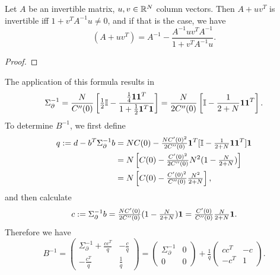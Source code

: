 \begin{lemma}
	Let \(A\) be an invertible matrix, \(u,v\in\mathbb{R}^N\) column vectors.
	Then \(A+ uv^T\) is invertible iff \(1+v^T A^{-1}u \neq 0\), and if that is
	the case, we have
	\[
		(A+uv^T) = A^{-1} - \frac{A^{-1}u v^T A^{-1}}{1+v^T A^{-1}u}.
	\]
\end{lemma}
\begin{proof}
\end{proof}

The application of this formula results in
\begin{equation}\label{eq: sigma_partial inverse}
	\Sigma_\partial^{-1}
	= \frac{N}{C''(0)}\left[
		\tfrac12\mathbb{I} - \frac{\tfrac14\mathbf{1}\mathbf{1}^T}{1+\tfrac12\mathbf{1}^T\mathbf{1}}
	\right]
	= \frac{N}{2C''(0)}\left[
		\mathbb{I} - \frac{1}{2+N}\mathbf{1}\mathbf{1}^T
	\right].
\end{equation}
To determine \(B^{-1}\), we first define
\begin{align*}
	q := d - b^T \Sigma_\partial^{-1}b
	&= NC(0) - \tfrac{NC'(0)^2}{2C''(0)}\mathbf{1}^T
	[\mathbb{I}-\tfrac1{2+N}\mathbf{1}\mathbf{1}^T]\mathbf{1}\\
	&= N\left[
		C(0) - \tfrac{C'(0)^2}{2C''(0)}
		N^2( 1-\tfrac{N}{2+N} )
	\right]\\
	&= N\left[
		C(0) - \tfrac{C'(0)^2}{C''(0)}
		\tfrac{N^2}{2+N}
	\right],
\end{align*}
and then calculate
\begin{equation}\label{eq: definition of c=sigma_partial^{-1} b}
	c:=\Sigma_\partial^{-1}b
	= \tfrac{\dimension\sqC'(0)}{2\sqC''(0)}( 1 - \tfrac{\dimension}{2+\dimension} )\ones
	= \tfrac{\sqC'(0)}{\sqC''(0)}\tfrac{\dimension}{2+\dimension}\ones.
\end{equation}
Therefore we have
\begin{equation}\label{eq: inv B split}
	B^{-1} = \begin{pmatrix}
		\Sigma_\partial^{-1}	+ \frac{cc^T}{q} & - \frac{c}{q}\\
		-\frac{c^T}{q} & \frac1q
	\end{pmatrix}
	= \begin{pmatrix}
		\Sigma_\partial^{-1} & 0 \\
		0 & 0
	\end{pmatrix}
	+ \tfrac1q \begin{pmatrix}
		cc^T & -c\\
		-c^T & 1
	\end{pmatrix}.
\end{equation}


